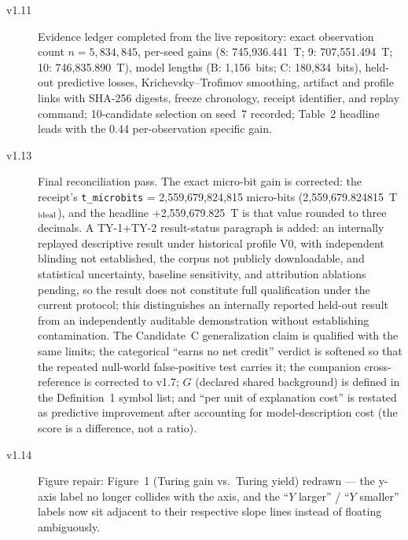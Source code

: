 \documentclass[11pt]{article}
\begin{document}
\begin{description}
\item[v1.11] Evidence ledger completed from the live repository: exact observation count \(n = 5{,}834{,}845\), per-seed gains (8: 745,936.441~T; 9: 707,551.494~T; 10: 746,835.890~T), model lengths (B: 1,156~bits; C: 180,834~bits), held-out predictive losses, Krichevsky--Trofimov smoothing, artifact and profile links with SHA-256 digests, freeze chronology, receipt identifier, and replay command; 10-candidate selection on seed~7 recorded; Table~2 headline leads with the 0.44 per-observation specific gain.
\item[v1.13] Final reconciliation pass. The exact micro-bit gain is corrected: the receipt's \texttt{t\_microbits} = 2{,}559{,}679{,}824{,}815 micro-bits (2{,}559{,}679.824815~T\(_{\rm ideal}\)), and the headline +2{,}559{,}679.825~T is that value rounded to three decimals. A TY-1+TY-2 result-status paragraph is added: an internally replayed descriptive result under historical profile V0, with independent blinding not established, the corpus not publicly downloadable, and statistical uncertainty, baseline sensitivity, and attribution ablations pending, so the result does not constitute full qualification under the current protocol; this distinguishes an internally reported held-out result from an independently auditable demonstration without establishing contamination. The Candidate~C generalization claim is qualified with the same limits; the categorical ``earns no net credit'' verdict is softened so that the repeated null-world false-positive test carries it; the companion cross-reference is corrected to v1.7; \(G\) (declared shared background) is defined in the Definition~1 symbol list; and ``per unit of explanation cost'' is restated as predictive improvement after accounting for model-description cost (the score is a difference, not a ratio).
\item[v1.14] Figure repair: Figure~1 (Turing gain vs.\ Turing yield) redrawn --- the y-axis label no longer collides with the axis, and the ``$Y$ larger'' / ``$Y$ smaller'' labels now sit adjacent to their respective slope lines instead of floating ambiguously.
\end{description}
\end{document}
